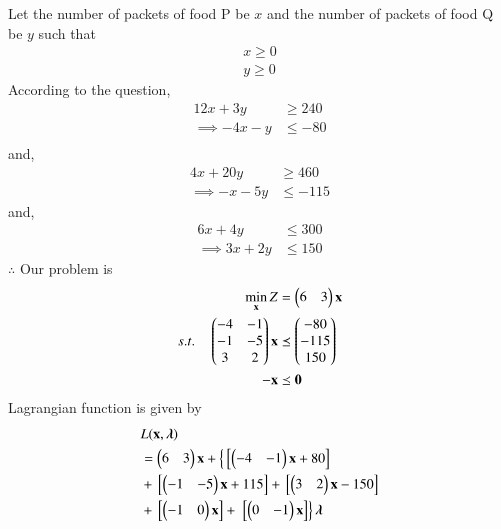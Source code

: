 \begin{table}[!ht]
    \centering
    \caption{Diet Requirements}
    \label{opt/36/tab:table1}
    \end{table}
    Let the number of packets of food P be $x$ and the number of packets of food Q be $y$  such that 
    \begin{align}
        x \geq 0 \\
        y \geq 0 
    \end{align}
    According to the question,
    \begin{align}
        12x+3y &\geq 240 \\
        \implies -4x-y &\leq -80 \\
    \end{align}
    and,
    \begin{align}
        4x+20y &\geq 460 \\
        \implies -x-5y &\leq -115 
    \end{align}
    and,
    \begin{align}
         6x+4y &\leq 300 \\
        \implies 3x+2y &\leq 150 
    \end{align}
    $\therefore$ Our problem is
    \begin{align}
            \min_{\mathbf{x}} Z &= \begin{pmatrix}6 & 3\end{pmatrix}\mathbf{x}\\
            s.t. \quad 
            \begin{pmatrix}-4 & -1 \\ -1 & -5 \\ 3 & 2 \end{pmatrix}\mathbf{x} &\preceq \begin{pmatrix}-80\\-115\\150\end{pmatrix} \\
            \mathbf{-x} &\preceq \mathbf{0}
    \end{align}
    Lagrangian function is given by
    \begin{equation}
    \begin{aligned}
        &L(\mathbf{x},\boldsymbol{\lambda}) \\ &= \begin{pmatrix}6 & 3\end{pmatrix}\mathbf{x}+\left\{{}\left[\begin{pmatrix}-4 & -1\end{pmatrix}\mathbf{x}+80\right]\right. \\ &+ {}\left[\begin{pmatrix}-1 & -5\end{pmatrix}\mathbf{x}+115\right] +{}\left[\begin{pmatrix}3 & 2\end{pmatrix}\mathbf{x}-150\right] \\ &+ {}\left[\begin{pmatrix}-1 & 0\end{pmatrix}\mathbf{x}\right] +\left.{}\left[\begin{pmatrix}0 & -1\end{pmatrix}\mathbf{x}\right]\right\}\boldsymbol{\lambda}
    \end{aligned}
    \end{equation}
